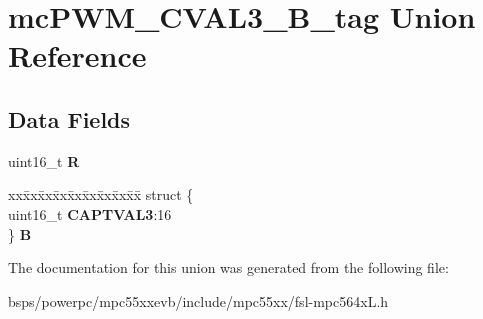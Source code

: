 \hypertarget{unionmcPWM__CVAL3__16B__tag}{}\section{mc\+P\+W\+M\+\_\+\+C\+V\+A\+L3\+\_\+B\+\_\+tag Union Reference}
\label{unionmcPWM__CVAL3__16B__tag}
\subsection*{Data Fields}
\begin{DoxyCompactItemize}
\item 
\mbox{\label{unionmcPWM__CVAL3__16B__tag_ac9e58624e812a43613224d65cbaa4f75}} 
uint16\+\_\+t {\bfseries R}
\item 
\mbox{\label{unionmcPWM__CVAL3__16B__tag_a0f41b73cb948426bd1857c936f37f658}} 
\begin{tabbing}
xx\=xx\=xx\=xx\=xx\=xx\=xx\=xx\=xx\=\kill
struct \{\\
\>uint16\_t {\bfseries CAPTVAL3}:16\\
\} {\bfseries B}\\

\end{tabbing}\end{DoxyCompactItemize}


The documentation for this union was generated from the following file\+:\begin{DoxyCompactItemize}
\item 
bsps/powerpc/mpc55xxevb/include/mpc55xx/fsl-\/mpc564x\+L.\+h\end{DoxyCompactItemize}
